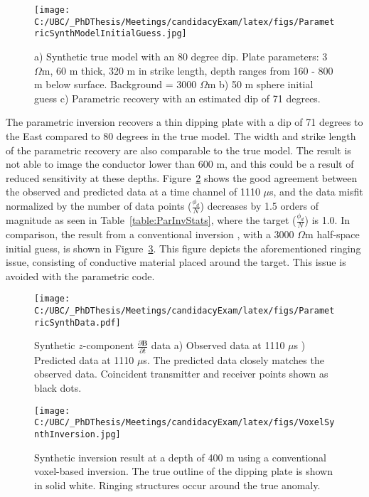 \documentclass[letterpaper,11pt]{article}
\begin{document}
\begin{figure}[h]
  \centering
  \texttt{[image: C:/UBC/\_PhDThesis/Meetings/candidacyExam/latex/figs/ParametricSynthModelInitialGuess.jpg]}
  \caption{ a) Synthetic true model with an 80 degree dip. Plate parameters: 3 $ \Omega $m, 60 m thick, 320 m in strike length, depth ranges from 160 - 800 m below surface. Background = 3000 $ \Omega $m \newline b) 50 m sphere initial guess c) Parametric recovery with an estimated dip of 71 degrees.}
  \label{fig:ParSynthModel}
\end{figure}

\clearpage

The parametric inversion recovers a thin dipping plate with a dip of 71 degrees to the East compared to 80 degrees in the true model.  The width and strike length of the parametric recovery are also comparable to the true model.  The result is not able to image the conductor lower than 600 m, and this could be a result of reduced sensitivity at these depths. Figure~\ref{fig:ParSynthData} shows the good agreement between the observed and predicted data at a time channel of 1110 $ \mu $s, and the data misfit normalized by the number of data points ($ {\frac{\phi_d}{N}} $) decreases by 1.5 orders of magnitude as seen in Table~\ref{table:ParInvStats}, where the target ($ {\frac{\phi_d}{N}} $) is 1.0. In comparison, the result from a conventional inversion \cite[]{Haber2014}, with a 3000 $ \Omega $m half-space initial guess, is shown in Figure~\ref{fig:VoxelSynthInversion}.  This figure depicts the aforementioned ringing issue, consisting of conductive material placed around the target. This issue is avoided with the parametric code. 

\begin{figure}[h]
  \centering
  \texttt{[image: C:/UBC/\_PhDThesis/Meetings/candidacyExam/latex/figs/ParametricSynthData.pdf]}
  \caption{ Synthetic $ z $-component $ \frac{\partial\mathbf{B}}{\partial t} $ data a) Observed data at 1110 $ \mu $s ) Predicted data at 1110 $ \mu $s. The predicted data closely matches the observed data. Coincident transmitter and receiver points shown as black dots.}
  \label{fig:ParSynthData}
\end{figure}

\begin{figure}[h]
  \centering
  \texttt{[image: C:/UBC/\_PhDThesis/Meetings/candidacyExam/latex/figs/VoxelSynthInversion.jpg]}
  \caption{Synthetic inversion result at a depth of 400 m using a conventional voxel-based inversion. The true outline of the dipping plate is shown in solid white. Ringing structures occur around the true anomaly.}
  \label{fig:VoxelSynthInversion}
\end{figure}
\end{document}
